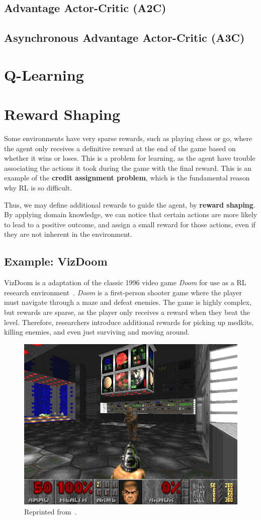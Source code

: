 \documentclass[12pt]{report}
\theoremstyle{definition}
\theoremstyle{remark}
\begin{document}
\subsection{Advantage Actor-Critic (A2C)}

\subsection{Asynchronous Advantage Actor-Critic (A3C)}

\section{Q-Learning}

\section{Reward Shaping}
Some environments have very sparse rewards, such as playing chess or go, where the agent only receives a definitive reward at the end of the game based on whether it wins or loses. This is a problem for learning, as the agent have trouble associating the actions it took during the game with the final reward. This is an example of the \textbf{credit assignment problem}, which is the fundamental reason why RL is so difficult.

Thus, we may define additional rewards to guide the agent, by \textbf{reward shaping}. By applying domain knowledge, we can notice that certain actions are more likely to lead to a positive outcome, and assign a small reward for those actions, even if they are not inherent in the environment.

\subsection{Example: VizDoom}

VizDoom is a adaptation of the classic 1996 video game \textit{Doom} for use as a RL research environment~\cite{kempka_vizdoom_2016}. \textit{Doom} is a first-person shooter game where the player must navigate through a maze and defeat enemies. The game is highly complex, but rewards are sparse, as the player only receives a reward when they beat the level. Therefore, researchers introduce additional rewards for picking up medkits, killing enemies, and even just surviving and moving around.

\begin{figure}[h]
    \centering
    \includegraphics[width=0.5\linewidth]{figs/doom.png}
    \caption{Reprinted from~\cite{kempka_vizdoom_2016}.}
    \label{fig:enter-label}
\end{figure}
\end{document}
